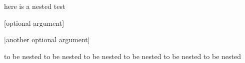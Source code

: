 here is a nested test
\begin{one}

	[optional argument]

	[another optional argument]

	to be nested to be nested
	to be nested to be nested
	to be nested to be nested
\end{one}
